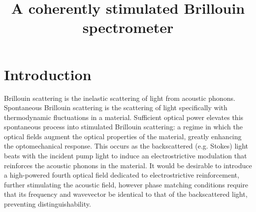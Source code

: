 \documentclass[
sn-nature,
twocolumn
]{sn-jnl}%
\begin{document}
\title[Article Title]{A coherently stimulated Brillouin spectrometer}

\author*[1,2]{ }
\author[3]{ }
\author[4]{ }
\author*[1,2]{ }





\abstract{}


\maketitle
\restoregeometry


\section{Introduction}\label{Introduction}

Brillouin scattering is the inelastic scattering of light from acoustic phonons. Spontaneous Brillouin scattering is the scattering of light specifically with thermodynamic fluctuations in a material. Sufficient optical power elevates this spontaneous process into stimulated Brillouin scattering: a regime in which the optical fields augment the optical properties of the material, greatly enhancing the optomechanical response. This occurs as the backscattered (e.g. Stokes) light beats with the incident pump light to induce an electrostrictive modulation that reinforces the acoustic phonons in the material. It would be desirable to introduce a high-powered fourth optical field dedicated to electrostrictive reinforcement, further stimulating the acoustic field, however phase matching conditions require that its frequency and wavevector be identical to that of the backscattered light, preventing distinguishability.
\end{document}
